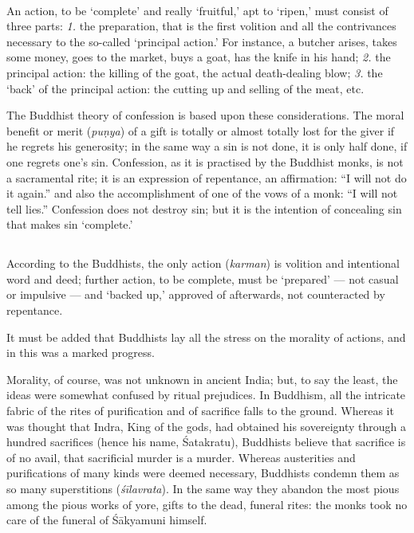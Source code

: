 \documentclass[a4paper, 11pt, oneside, english, landscape]{article}
\begin{document}
\paragraph{}
An action, to be `complete' and really `fruitful,' apt to `ripen,' must consist of three parts: \emph{1.} the preparation, that is the first volition and all the contrivances necessary to the so-called `principal action.' For instance, a butcher arises, takes some money, goes to the market, buys a goat, has the knife in his hand; \emph{2.} the principal action: the killing of the goat, the actual death-dealing blow; \emph{3.} the `back' of the principal action: the cutting up and selling of the meat, etc.

The Buddhist theory of confession is based upon these considerations. The moral benefit or merit (\emph{puṇya}) of a gift is totally or almost totally lost for the giver if he regrets his generosity; in the same way a sin is not done, it is only half done, if one regrets one's sin. Confession, as it is practised by the Buddhist monks, is not a sacramental rite; it is an expression of repentance, an affirmation: ``I will not do it again.'' and also the accomplishment of one of the vows of a monk: ``I will not tell lies.'' Confession does not destroy sin; but it is the intention of concealing sin that makes sin `complete.'

\subsection{}
\paragraph{}
According to the Buddhists, the only action (\emph{karman}) is volition and intentional word and deed; further action, to be complete, must be `prepared' --- not casual or impulsive --- and `backed up,' approved of afterwards, not counteracted by repentance.

It must be added that Buddhists lay all the stress on the morality of actions, and in this was a marked progress.

Morality, of course, was not unknown in ancient India; but, to say the least, the ideas were somewhat confused by ritual prejudices. In Buddhism, all the intricate fabric of the rites of purification and of sacrifice falls to the ground. Whereas it was thought that Indra, King of the gods, had obtained his sovereignty through a hundred sacrifices (hence his name, Śatakratu), Buddhists believe that sacrifice is of no avail, that sacrificial murder is a murder. Whereas austerities and purifications of many kinds were deemed necessary, Buddhists condemn them as so many superstitions (\emph{śīlavrata}). In the same way they abandon the most pious among the pious works of yore, gifts to the dead, funeral rites: the monks took no care of the funeral of Śākyamuni himself.
\end{document}
